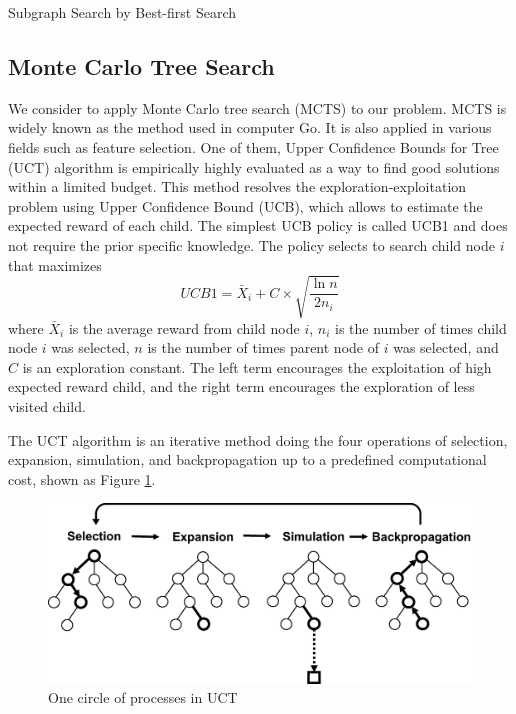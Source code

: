 \begin{algorithm2e}[H]
  \caption{Subgraph Search by Best-first Search}
  \label{alg:bfs}
\end{algorithm2e}

\subsection{Monte Carlo Tree Search}
We consider to apply Monte Carlo tree search (MCTS) 
\cite{Levente:2006, Romaric:2010, Cameron:2012} to our problem. 
MCTS is widely known as the method used in computer Go. 
It is also applied in various fields such as feature selection. 
One of them, Upper Confidence Bounds for Tree (UCT) algorithm 
\cite{Levente:2006} is empirically highly evaluated as a way to find good solutions within a limited budget.
This method resolves the exploration-exploitation problem using Upper Confidence Bound (UCB),
which allows to estimate the expected reward of each child.
The simplest UCB policy is called UCB1 and does not require the prior specific knowledge.
The policy selects to search child node $i$ that maximizes
\begin{equation}
  \label{eq:ucb}
  UCB1 = \bar{X}_{i} + C \times \sqrt{\frac{\ln{n}}{2 n_{i}}}
\end{equation}
where $\bar{X}_{i}$ is the average reward from child node $i$, 
$n_{i}$ is the number of times child node $i$ was selected, 
$n$ is the number of times parent node of $i$ was selected,
and $C$ is an exploration constant.
The left term encourages the exploitation of high expected reward child,
and the right term encourages the exploration of less visited child.

The UCT algorithm is an iterative method 
doing the four operations of selection, expansion, 
simulation, and backpropagation up to a predefined computational cost, shown as Figure \ref{fig:MCTS}.
\begin{figure}[t]
  \centering
  \includegraphics[width=0.9\linewidth]{img/MCTS.eps}
  \caption{One circle of processes in UCT}
  \label{fig:MCTS}
\end{figure}


